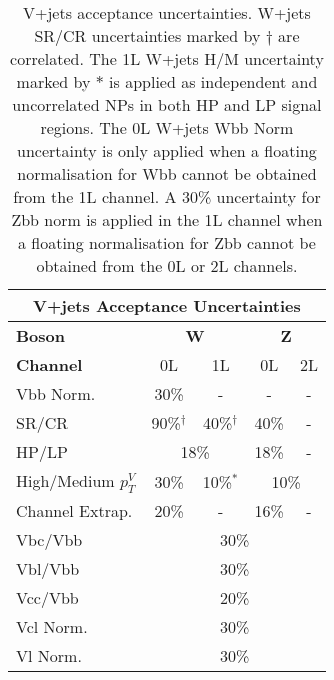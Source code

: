 \begin{table}[!htbp] 
    \footnotesize 
    \centering 
    \def\arraystretch{1.4} 
    \begin{tabular}{l|c|c|c|c}
        \hline\hline
        \multicolumn{5}{c}{V+jets Acceptance Uncertainties}            
        \\ \hline\hline
        \textbf{Boson}      & \multicolumn{2}{c|}{\textbf{W}} & \multicolumn{2}{c}{\textbf{Z}} 
        \\ \hline
        \textbf{Channel}    & 0L          & 1L         & 0L         & 2L          
        \\ \hline\hline
        Vbb Norm.           &   30\%      &     -      &     -      &          -  
        \\ \hline
        SR/CR               &   90\%$^\dagger$         & 40\%$^\dagger$ &      40\%     & -         
        \\ \hline
        HP/LP               & \multicolumn{2}{c|}{18\%}             &   18\%      & -         
        \\ \hline
        High/Medium $p_T^V$ &   30\%      & 10\%$^*$       & \multicolumn{2}{c}{10\%}          
        \\ \hline
        Channel Extrap.             &   20\%      &   -        &    16\%    & -
        \\ \hline
        Vbc/Vbb             & \multicolumn{4}{c}{30\%}                       
        \\ \hline
        Vbl/Vbb             & \multicolumn{4}{c}{30\%}                       
        \\ \hline
        Vcc/Vbb             & \multicolumn{4}{c}{20\%}                       
        \\ \hline
        Vcl Norm.           & \multicolumn{4}{c}{30\%}                       
        \\ \hline
        Vl Norm.            & \multicolumn{4}{c}{30\%}                       
        \\ \hline%
    \end{tabular}
    \caption{ V+jets acceptance uncertainties. W+jets SR/CR uncertainties marked by $\dagger$ are correlated. The 1L W+jets H/M uncertainty marked by $*$ is applied as independent and uncorrelated NPs in both HP and LP signal regions. The 0L W+jets Wbb Norm uncertainty is only applied when a floating normalisation for Wbb cannot be obtained from the 1L channel. A 30\% uncertainty for Zbb norm is applied in the 1L channel when a floating normalisation for Zbb cannot be obtained from the 0L or 2L channels. }
    \label{tab:Vjets acceptance uncerts}
\end{table}